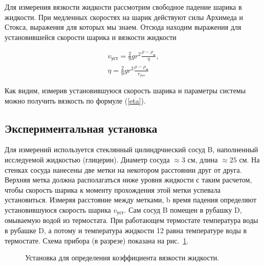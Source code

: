 \documentclass[a4paper, 12pt]{article}
\begin{document}
Для измерения вязкости жидкости рассмотрим свободное падение шарика в жидкости.
При медленных скоростях на шарик действуют силы Архимеда и Стокса, выражения для
которых мы знаем. Отсюда находим выражения для установившейся скорости шарика и
вязкости жидкости

\begin{eqnarray} v_{уст} =\frac{2}{9}gr^2\frac{\rho - \rho_{\text{ж}}}{\eta}\label{v_ust},\\
    \eta    =\frac{2}{9}gr^2\frac{\rho - \rho_{\text{ж}}}{v_{\text{уст}}}\label{eta}
\end{eqnarray}

Как видим, измерив установившуюся скорость шарика и параметры системы можно
получить вязкость по формуле (\ref{eta}).

\subsection{Экспериментальная установка} Для измерений используется стеклянный
цилиндрчиеский сосуд B, наполненный исследуемой жидкостью (глицерин). Диаметр
сосуда $\approx 3$ см, длина $\approx 25$ см. На стенках сосуда нанесены две
метки на некотором расстоянии друг от друга. Верхняя метка должна располагаться
ниже уровня жидкости с таким расчетом, чтобы скорость шарика к моменту
прохождения этой метки успевала установиться. Измеряя расстояние между метками,
b время падения определяют установившуюся скорость шарика $v_{уст}$. Сам сосуд B
помещен в рубашку D, омываемую водой из термостата. При работающем термостате
температура воды в рубашке D, а потому и температура жидкости 12 равна
температуре воды в термостате.  Схема прибора (в разрезе) показана на
рис.~\ref{stand}.  \begin{figure}[h]
 \caption{Установка для
определения коэффициента вязкости жидкости.} \label{stand} \end{figure}
\end{document}
